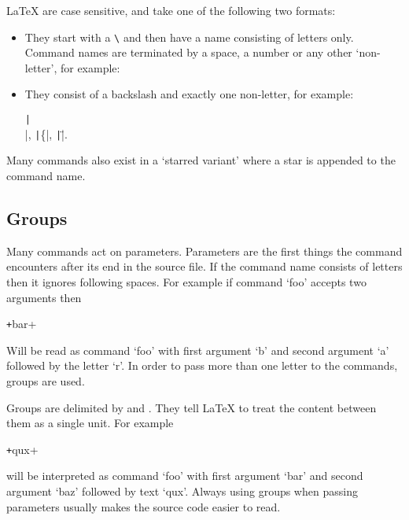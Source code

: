 \LaTeX{}  are case sensitive, and take one of the following
two formats:

\begin{itemize}
  \item They start with a  \verb|\| and then have a name
        consisting of letters only. Command names are terminated by a space, a
        number or any other \enquote*{non-letter}, for example:
  \item They consist of a backslash and exactly one non-letter, for example:
        \begin{chktexignore}
          \texttt|\\|, \texttt|\{|, \texttt|\"|.
        \end{chktexignore}
\end{itemize}
Many commands also exist in a `starred variant' where a star is appended to the
command name.

\subsection{Groups}

Many commands act on parameters. Parameters are the first things the command
encounters after its end in the source file. If the command name consists of
letters then it ignores following spaces. For example if command \enquote*{foo}
accepts two arguments then
\begin{code}
  \texttt+\foo bar+
\end{code}
Will be read as command \enquote*{foo} with first argument \enquote*{b} and
second argument \enquote*{a} followed by the letter \enquote*{r}. In order to pass
more than one letter to the commands, groups are used.

Groups are delimited by \ai{\{} and \ai{\}}. They tell \LaTeX{} to treat the
content between them as a single unit. For example
\begin{code}
  \texttt+qux+
\end{code}
will be interpreted as command \enquote*{foo} with first argument
\enquote*{bar} and second argument \enquote*{baz} followed by text
\enquote*{qux}. Always using groups when passing parameters usually makes the
source code easier to read.

